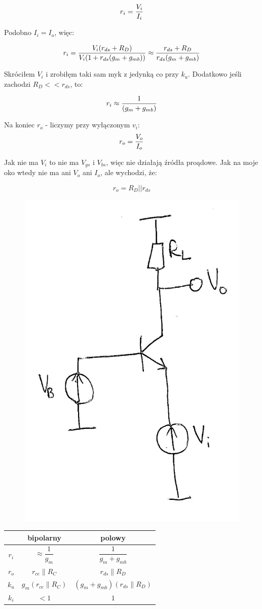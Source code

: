 \documentclass[10pt,a4paper]{article}
\begin{document}
\begin{equation}
r_i = {V_i \over I_i} 
\end{equation}

Podobno $I_i = I_o$, więc:

\begin{equation}
r_i = {V_i(r_{ds} + R_D) \over V_i(1+r_{ds}(g_m + g_{mb}))} \approx {r_{ds} + R_D \over r_{ds}(g_m + g_{mb})}
\end{equation}

Skróciłem $V_i$ i zrobiłęm taki sam myk z jedynką co przy $k_u$. Dodatkowo jeśli zachodzi $R_D << r_{ds}$, to:

\begin{equation}
r_i \approx  {1 \over (g_m + g_{mb})}
\end{equation}

Na koniec $r_o$ - liczymy przy wyłączonym $v_i$:\\

\begin{equation}
r_o = {V_o \over I_o} 
\end{equation}

Jak nie ma $V_i$ to nie ma $V_{gs}$ i $V_{bs}$, więc nie działają źródła proądowe. Jak na moje oko wtedy nie ma ani $V_o$ ani $I_o$, ale wychodzi, że:

\begin{equation}
r_o = R_D || r_{ds}
\end{equation}

\begin{figure}[H]
\centering
\includegraphics[height=0.5\textwidth]{WB}
\end{figure}
\begin{tabular}{c|c|c}
& bipolarny & polowy \\
\hline
$r_i$ & $\approx \dfrac{1}{g_m}$ & $ \dfrac{1}{g_m + g_{mb}}$ \\ 

$r_o$ & $r_{ce}\parallel R_C$ & $r_{ds} \parallel R_D $\\ 

$k_u$ & $g_m (r_{ce}\parallel R_C)$ & $(g_m + g_{mb})(r_{ds}\parallel R_D)$  \\ 

$k_i$ & $<1$ & $1$  \\ 

\end{tabular} 
\end{document}

